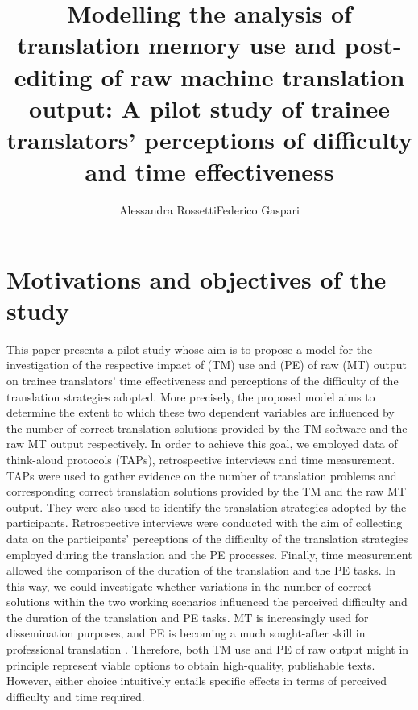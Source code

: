 \documentclass[output=paper]{LSP/langsci}
\title{Modelling the analysis of translation memory use and post-editing of raw machine translation output: A pilot study of trainee translators' perceptions of difficulty and time effectiveness}
\author{Alessandra Rossetti\affiliation{SALIS Dublin City University Ireland}\lastand Federico Gaspari\affiliation{ADAPT Centre Dublin City University Ireland\newline Università per Stranieri ``Dante Alighieri'' Reggio Calabria Italy}}
\begin{document}
\maketitle

\section{Motivations and objectives of the study}\label{ressetti-gaspari:sec:1}

This paper presents a pilot study whose aim is to propose a model for the investigation of the respective impact of  (TM) use and  (PE) of raw  (MT) output on trainee translators' time effectiveness and perceptions of the difficulty of the translation strategies adopted. More precisely, the proposed model aims to determine the extent to which these two dependent variables are influenced by the number of correct translation solutions provided by the TM software and the raw MT output respectively. In order to achieve this goal, we employed data  of think-aloud protocols (TAPs), retrospective interviews and time measurement. TAPs were used to gather evidence on the number of translation problems and corresponding correct translation solutions provided by the TM and the raw MT output. They were also used to identify the translation strategies adopted by the participants. Retrospective interviews were conducted with the aim of collecting data on the participants' perceptions of the difficulty of the translation strategies employed during the translation and the PE processes. Finally, time measurement allowed the comparison of the duration of the translation and the PE tasks. In this way, we could investigate whether variations in the number of correct solutions within the two working scenarios influenced the perceived difficulty and the duration of the translation and PE tasks. MT is increasingly used for dissemination purposes, and PE is becoming a much sought-after skill in professional translation \citep{OBrien2014Towards}. Therefore, both TM use and PE of raw output might in principle represent viable options to obtain high-quality, publishable texts. However, either choice intuitively entails specific effects in terms of perceived difficulty and time required.
\end{document}
